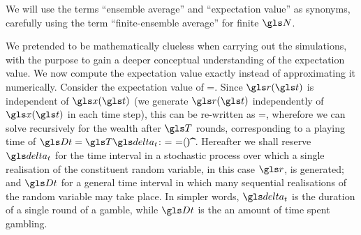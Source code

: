 We will
use the terms ``ensemble average'' and ``expectation value'' as synonyms, 
carefully using the term ``finite-ensemble average'' for finite $\N$.
%
%

We pretended to be mathematically clueless when carrying out the simulations,
with the purpose to gain a deeper conceptual understanding of the expectation 
value. We now compute the expectation value exactly instead of 
approximating it numerically. Consider the expectation value of   
\be
\ave{\x(\t+\dt)}=\ave{\x(\t)\gr(\t)}. 
\ee
Since $\gr(\t)$ is independent of $\x(\t)$ (we generate $\gr(\t)$ 
independently of $\x(\t)$ in each time step), this can be re-written as
\be
\ave{\x(\t+\dt)}=\ave{\x(\t)}\ave{\gr},
\ee
wherefore we can solve recursively for the wealth after $\T$ rounds, corresponding to a playing time of $\Dt=\T\dt$:
\be
\ave{\x(\t+\Dt)} = \ave{\x(\t+\T\dt)}=\x(\t)\ave{\gr}^\T.
\ee
Hereafter we shall reserve $\dt$ for the time interval in a stochastic process over which a single realisation of the constituent random variable, in this case $\gr$, is generated; and $\Dt$ for a general time interval in which many sequential realisations of the random variable may take place. In simpler words, $\dt$ is the duration of a single round of a gamble, while $\Dt$ is the an amount of time spent gambling.

